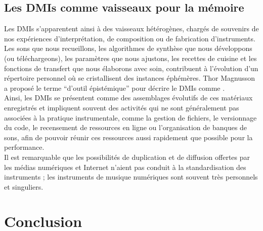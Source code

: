 \subsection{Les DMIs comme vaisseaux pour la mémoire}
\label{sec:ephemeral:vessels}

\noindent Les \glspl{DMI} s'apparentent ainsi à des vaisseaux hétérogènes, chargés de souvenirs de nos expériences d'interprétation, de composition ou de fabrication d'instruments. Les sons que nous recueillons, les algorithmes de synthèse que nous développons (ou téléchargeons), les paramètres que nous ajustons, les recettes de cuisine et les fonctions de transfert que nous élaborons avec soin, contribuent à l'évolution d'un répertoire personnel où se cristallisent des instances éphémères. Thor Magnusson a proposé le terme ``d'outil épistémique'' pour décrire le \glspl{DMI} comme  \cite{magnusson_epistemic_2009}.\\
\indent Ainsi, les \glspl{DMI} se présentent comme des assemblages évolutifs de ces matériaux enregistrés et impliquent souvent des activités qui ne sont généralement pas associées à la pratique instrumentale, comme la gestion de fichiers, le versionnage du code, le recensement de ressources en ligne ou l'organisation de banques de sons, afin de pouvoir réunir ces ressources aussi rapidement que possible pour la performance.\\
\indent Il est remarquable que les possibilités de duplication et de diffusion offertes par les médias numériques et Internet n'aient pas conduit à la standardisation des instruments ; les instruments de musique numériques sont souvent très personnels et singuliers.

\section{Conclusion}

